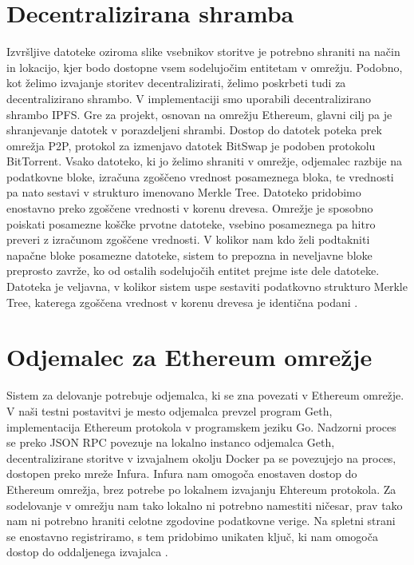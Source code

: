 \documentclass[a4paper, 12pt]{book}
\begin{document}
\section{Decentralizirana shramba}
Izvršljive datoteke oziroma slike vsebnikov storitve je potrebno shraniti na način in lokacijo, kjer bodo dostopne vsem sodelujočim entitetam v omrežju.
Podobno, kot želimo izvajanje storitev decentralizirati, želimo poskrbeti tudi za decentralizirano shrambo.
V implementaciji smo uporabili decentralizirano shrambo IPFS.
Gre za projekt, osnovan na omrežju Ethereum, glavni cilj pa je shranjevanje datotek v porazdeljeni shrambi.
Dostop do datotek poteka prek omrežja P2P, protokol za izmenjavo datotek BitSwap je podoben protokolu BitTorrent.
Vsako datoteko, ki jo želimo shraniti v omrežje, odjemalec razbije na podatkovne bloke, izračuna zgoščeno vrednost posameznega bloka, te vrednosti pa nato sestavi v strukturo imenovano Merkle Tree.
Datoteko pridobimo enostavno preko zgoščene vrednosti v korenu drevesa.
Omrežje je sposobno poiskati posamezne koščke prvotne datoteke, vsebino posameznega pa hitro preveri z izračunom zgoščene vrednosti. V kolikor nam kdo želi podtakniti napačne bloke posamezne datoteke, sistem to prepozna in neveljavne bloke preprosto zavrže, ko od ostalih sodelujočih entitet prejme iste dele datoteke. Datoteka je veljavna, v kolikor sistem uspe sestaviti podatkovno strukturo Merkle Tree, katerega zgoščena vrednost v korenu drevesa je identična podani \cite{Ipfs}.

\section{Odjemalec za Ethereum omrežje}
Sistem za delovanje potrebuje odjemalca, ki se zna povezati v Ethereum omrežje.
V naši testni postavitvi je mesto odjemalca prevzel program Geth, implementacija Ethereum protokola v programskem jeziku Go. \cite{Geth}
Nadzorni proces se preko JSON RPC povezuje na lokalno instanco odjemalca Geth, decentralizirane storitve v izvajalnem okolju Docker pa se 
povezujejo na proces, dostopen preko mreže Infura.
Infura nam omogoča enostaven dostop do Ethereum omrežja, brez potrebe po lokalnem izvajanju Ehtereum protokola.
Za sodelovanje v omrežju nam tako lokalno ni potrebno namestiti ničesar, prav tako nam ni potrebno hraniti
celotne zgodovine podatkovne verige. 
Na spletni strani se enostavno registriramo, s tem pridobimo unikaten ključ, ki nam omogoča dostop do oddaljenega izvajalca \cite{Infura}.
\end{document}
